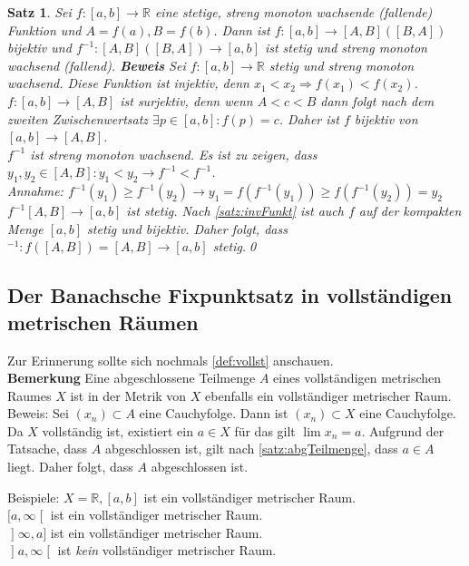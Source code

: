 \documentclass[ngerman,titlepage,twoside, parskip=half*]{scrreprt}
\newcommand*{\R}{\mathbb{R}}
\theoremstyle{plain}
\newtheorem{theorem}{Satz}[section]
\theoremstyle{definition}
\theoremstyle{remark}
\newcommand*{\lsofint}[1]{\mathopen{]}#1]}   %
\newcommand*{\rsofint}[1]{[#1\mathclose{[}}  %
\newcommand*{\bsofint}[1]{\mathopen{]}#1\mathclose{[}} %
\begin{document}
\begin{theorem}
  \label{satz:reellInvFkt}
Sei $f\colon[a,b]\rightarrow\R$ eine stetige, streng monoton wachsende (fallende) Funktion und $A=f(a), B=f(b)$. Dann ist
$f\colon[a,b]\rightarrow [A,B] ([B,A])$ bijektiv und $f^{-1}\colon[A,B]([B,A])\rightarrow [a,b]$ ist stetig und streng 
monoton wachsend (fallend).
\textbf{Beweis} Sei $f\colon[a,b]\rightarrow\R$ stetig und streng monoton wachsend. Diese Funktion ist injektiv, denn
$x_1<x_2\Rightarrow f(x_1)<f(x_2)$.\\
$f\colon[a,b]\rightarrow[A,B]$ ist surjektiv, denn wenn $A<c<B$ dann folgt nach dem zweiten Zwischenwertsatz $\exists
p\in [a,b]\colon f(p)=c$. Daher ist $f$ bijektiv von $[a,b]\rightarrow [A,B]$.\\
$f^{-1}$ ist streng monoton wachsend. Es ist zu zeigen, dass $y_1,y_2\in [A,B]\colon y_1<y_2\rightarrow f^{-1}<f^{-1}$.\\
Annahme: $f^{-1}(y_1)\geq f^{-1}(y_2)\rightarrow y_1=f(f^{-1}(y_1))\geq f(f^{-1}(y_2))=y_2$\textnormal{\lightning}\\
$f^{-1}[A,B]\rightarrow [a,b]$ ist stetig. Nach \autoref{satz:invFunkt} ist auch $f$ auf der kompakten Menge 
$[a,b]$ stetig und bijektiv. Daher folgt, dass $^{-1}\colon f([A,B])=[A,B]\rightarrow [a,b]$ stetig.\qed
\end{theorem}

\subsection{Der Banachsche Fixpunktsatz in vollständigen metrischen Räumen}

Zur Erinnerung sollte sich nochmals \autoref{def:vollst} anschauen.\\
\textbf{Bemerkung} Eine abgeschlossene Teilmenge $A$ eines vollständigen metrischen Raumes $X$ ist in der Metrik
von $X$ ebenfalls ein vollständiger metrischer Raum.\\
Beweis: Sei $(x_n)\subset A$ eine Cauchyfolge. Dann ist $(x_n)\subset X$ eine Cauchyfolge. Da $X$ vollständig ist,
existiert ein $a\in X$ für das gilt $\lim x_n=a$. Aufgrund der Tatsache, dass $A$ abgeschlossen ist, gilt nach
\autoref{satz:abgTeilmenge}, dass $a\in A$ liegt. Daher folgt, dass $A$ abgeschlossen ist.

Beispiele: $X=\R, [a,b]$ ist ein vollständiger metrischer Raum.\\
$\rsofint{a,\infty}$ ist ein vollständiger metrischer Raum.\\
$\lsofint{\infty,a}$ ist ein vollständiger metrischer Raum.\\
$\bsofint{a,\infty}$ ist \emph{kein} vollständiger metrischer Raum.
\end{document}
